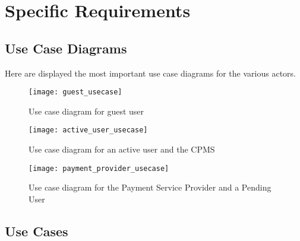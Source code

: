 \newcommand{\usecase}[5]{{
	\setlength\extrarowheight{5pt}
	\begin{tabular}{|p{3cm}|p{10cm}|}
		\hline
		Actor & #1\\
		\hline
		Entry conditions & #2\\
		\hline
		Event flow & #3\\
		\hline
		Exit condition & #4\\
		\hline
		Exceptions & #5\\
		\hline
	\end{tabular}
}}


\chapter{Specific Requirements}

\section{Use Case Diagrams}
Here are displayed the most important use case diagrams for the various actors.

\begin{figure}[h]
\centering
\texttt{[image: guest\_usecase]}
\caption{Use case diagram for guest user}
\end{figure}


\begin{figure}[h]
\centering
\texttt{[image: active\_user\_usecase]}
\caption{Use case diagram for an active user and the CPMS}
\end{figure}


\begin{figure}[h]
\centering
\texttt{[image: payment\_provider\_usecase]}
\caption{Use case diagram for the Payment Service Provider and a Pending User}
\end{figure}

\clearpage


\section{Use Cases}

